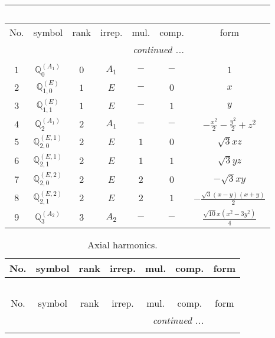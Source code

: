 \documentclass[fleqn,10pt,landscape]{article}
\begin{document}
\begin{itemize}
\begin{center}
\begin{longtable}{ccccccc}
\multicolumn{6}{l}{\tablename\ \thetable{}} \\
 \hline \hline
No. & symbol & rank & irrep. & mul. & comp. & form \\ \hline \endhead

 \hline \hline
\multicolumn{6}{r}{\footnotesize\it continued ...} \\ \endfoot

 \hline \hline
\multicolumn{6}{r}{} \\ \endlastfoot

$ 1 $ & $ \mathbb{Q}_{0}^{(A_{1})} $ & $ 0 $ & $ A_{1} $ & $ - $ & $ - $ & $ 1 $ \\ \hline
$ 2 $ & $ \mathbb{Q}_{1,0}^{(E)} $ & $ 1 $ & $ E $ & $ - $ & $ 0 $ & $ x $ \\
$ 3 $ & $ \mathbb{Q}_{1,1}^{(E)} $ & $ 1 $ & $ E $ & $ - $ & $ 1 $ & $ y $ \\ \hline
$ 4 $ & $ \mathbb{Q}_{2}^{(A_{1})} $ & $ 2 $ & $ A_{1} $ & $ - $ & $ - $ & $ - \frac{x^{2}}{2} - \frac{y^{2}}{2} + z^{2} $ \\
$ 5 $ & $ \mathbb{Q}_{2,0}^{(E,1)} $ & $ 2 $ & $ E $ & $ 1 $ & $ 0 $ & $ \sqrt{3} x z $ \\
$ 6 $ & $ \mathbb{Q}_{2,1}^{(E,1)} $ & $ 2 $ & $ E $ & $ 1 $ & $ 1 $ & $ \sqrt{3} y z $ \\
$ 7 $ & $ \mathbb{Q}_{2,0}^{(E,2)} $ & $ 2 $ & $ E $ & $ 2 $ & $ 0 $ & $ - \sqrt{3} x y $ \\
$ 8 $ & $ \mathbb{Q}_{2,1}^{(E,2)} $ & $ 2 $ & $ E $ & $ 2 $ & $ 1 $ & $ - \frac{\sqrt{3} \left(x - y\right) \left(x + y\right)}{2} $ \\ \hline
$ 9 $ & $ \mathbb{Q}_{3}^{(A_{2})} $ & $ 3 $ & $ A_{2} $ & $ - $ & $ - $ & $ \frac{\sqrt{10} x \left(x^{2} - 3 y^{2}\right)}{4} $ \\
\end{longtable}
\end{center}
\begin{center}
\renewcommand{\arraystretch}{1.3}
\begin{longtable}{ccccccc}
\caption{Axial harmonics.}
 \\
 \hline \hline
No. & symbol & rank & irrep. & mul. & comp. & form \\ \hline \endfirsthead

\multicolumn{6}{l}{\tablename\ \thetable{}} \\
 \hline \hline
No. & symbol & rank & irrep. & mul. & comp. & form \\ \hline \endhead

 \hline \hline
\multicolumn{6}{r}{\footnotesize\it continued ...} \\ \endfoot


\end{longtable}
\end{center}
\end{itemize}
\end{document}
